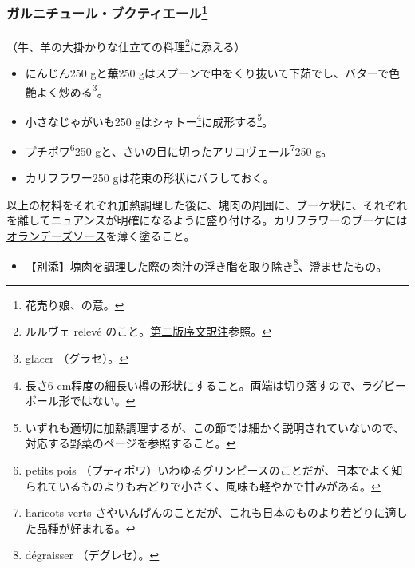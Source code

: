 \begin{recette}
\atoaki{}

\hypertarget{garniture-bouquetiere}{%
\subsubsection[ガルニチュール・ブクティエール]{\texorpdfstring{ガルニチュール・ブクティエール\footnote{花売り娘、の意。}}{ガルニチュール・ブクティエール}}\label{garniture-bouquetiere}}



（牛、羊の大掛かりな仕立ての料理\footnote{ルルヴェ relevé
  のこと。\protect\hyperlink{releve}{第二版序文訳注}参照。}に添える）

\begin{itemize}
\item
  にんじん250 gと蕪250
  gはスプーンで中をくり抜いて下茹でし、バターで色艶よく炒める\footnote{glacer
    （グラセ）。}。
\item
  小さなじゃがいも250 gはシャトー\footnote{長さ6
    cm程度の細長い樽の形状にすること。両端は切り落すので、ラグビーボール形ではない。}に成形する\footnote{いずれも適切に加熱調理するが、この節では細かく説明されていないので、対応する野菜のページを参照すること。}。
\item
  プチポワ\footnote{petits pois
    （プティポワ）いわゆるグリンピースのことだが、日本でよく知られているものよりも若どりで小さく、風味も軽やかで甘みがある。}250
  gと、さいの目に切ったアリコヴェール\footnote{haricots verts
    さやいんげんのことだが、これも日本のものより若どりに適した品種が好まれる。}250
  g。
\item
  カリフラワー250 gは花束の形状にバラしておく。
\end{itemize}

以上の材料をそれぞれ加熱調理した後に、塊肉の周囲に、ブーケ状に、それぞれを離してニュアンスが明確になるように盛り付ける。カリフラワーのブーケには\protect\hyperlink{sauce-hollandaise}{オランデーズソース}を薄く塗ること。

\begin{itemize}
\tightlist
\item
  【別添】塊肉を調理した際の肉汁の浮き脂を取り除き\footnote{dégraisser
    （デグレセ）。}、澄ませたもの。
\end{itemize}


\end{recette}
